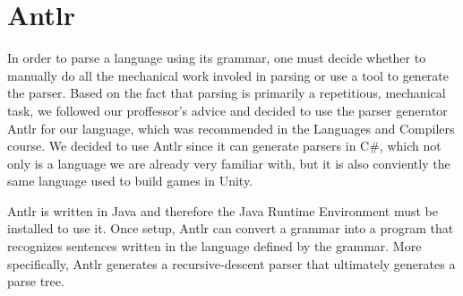 \section{Antlr}
In order to parse a language using its grammar, one must decide whether to manually do all the mechanical work involed in parsing or use a tool to generate the parser.
Based on the fact that parsing is primarily a repetitious, mechanical task, we followed our proffessor's advice and decided to use the parser generator Antlr for our language, which was recommended in the Languages and Compilers course. 
We decided to use Antlr since it can generate parsers in C\#, which not only is a language we are already very familiar with, but it is also conviently the same language used to build games in Unity. \

Antlr is written in Java and therefore the Java Runtime Environment must be installed to use it. 
Once setup, Antlr can convert a grammar into a program that recognizes sentences written in the language defined by the grammar.
More specifically, Antlr generates a recursive-descent parser that ultimately generates a parse tree.